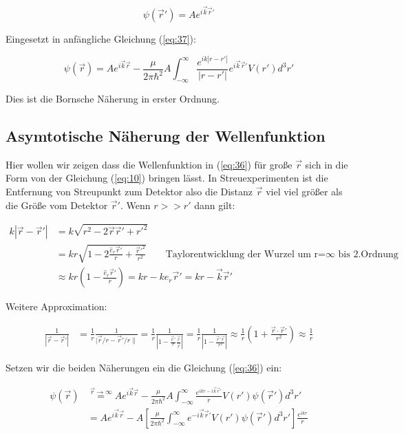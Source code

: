\begin{equation}
  \label{eq:40}
   \psi(\vec r') =  Ae^{i\vec k \vec r'}
\end{equation}

Eingesetzt in anfängliche Gleichung (\ref{eq:37}):

\begin{equation}
  \label{eq:41}
   \psi(\vec r) =  Ae^{i\vec k \vec r}  -\frac{\mu}{2\pi\hbar^2}A \int_{-\infty}^\infty \frac{ e^{ik |r-r'| }}{|r-r'|  }e^{i\vec k \vec r'}  V(r')   d^3 r'
\end{equation}


Dies ist die Bornsche Näherung in erster Ordnung. 


\subsection{Asymtotische Näherung der Wellenfunktion}

Hier wollen wir zeigen dass die Wellenfunktion in (\ref{eq:36}) für große \(\vec r\) sich in die Form von der Gleichung (\ref{eq:10}) bringen lässt. In Streuexperimenten ist die Entfernung von Streupunkt zum Detektor also die Distanz \(\vec r\) viel viel größer als die Größe vom Detektor \(\vec r'\).  Wenn \(r>> r'\) dann gilt:

\begin{align}
  \label{eq:42}
  k|\vec r - \vec r'| &= k\sqrt{ r^2-2\vec r\vec r' + r'^2 } \\
 &= kr\sqrt{ 1-2\frac{\hat e_r\vec r'}{r} + \frac{\vec r'^2}{r^2} } \qquad \text{Taylorentwicklung der Wurzel um r=}\infty\text{ bis 2.Ordnung}\\ 
 &\approx kr(1-\frac{\hat e_r\vec r'}{r}) = kr - k\hat e_r\vec r'= kr- \vec k\vec r'
\end{align}


Weitere Approximation:


\begin{align}
  \label{eq:43}
  \frac{1}{|\vec r - \vec r'| } &= \frac{1}{r}\frac{1}{|\vec r/r- \vec r'/r\|} = \frac{1}{r}\frac{1}{|1 -  \frac{\vec r'}{r} \frac{\vec r}{\vec r}|} = \frac{1}{r}\frac{1}{|1 -  \frac{\vec r'\vec r}{r^2} |} \approx \frac{1}{r}\left(1+\frac{\vec r\cdot\vec r'}{r^2}\right) \approx \frac{1}{r} 
\end{align}

Setzen wir die beiden Näherungen ein die Gleichung (\ref{eq:36}) ein:


\begin{align}
  \label{eq:44}
   \psi(\vec r) &\stackrel{\vec r\to \infty}=  Ae^{i\vec k \vec r}  -\frac{\mu}{2\pi\hbar^2}A \int_{-\infty}^\infty \frac{ e^{i kr - i\vec k\vec r'  }}{r} V(r')\psi(\vec r')   d^3 r' \\
&=  Ae^{i\vec k \vec r}  - A\left[\frac{\mu}{2\pi\hbar^2}\int_{-\infty}^\infty e^{- i\vec k\vec r' }  V(r') \psi(\vec r') d^3 r'\right] \frac{ e^{i kr }}{r} 
\end{align}


